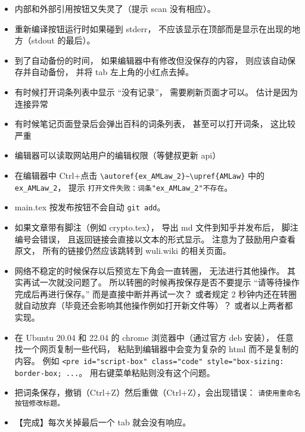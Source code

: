 \begin{itemize}
\item 内部和外部引用按钮又失灵了（提示 scan 没有相应）。

\item 重新编译按钮运行时如果碰到 stderr， 不应该显示在顶部而是显示在出现的地方（stdout 的最后）。

\item 到了自动备份的时间， 如果编辑器中有修改但没保存的内容， 则应该自动保存并自动备份， 并将 tab 左上角的小红点去掉。

\item 有时候打开词条列表中显示 “没有记录”， 需要刷新页面才可以。 估计是因为连接异常

\item 有时候笔记页面登录后会弹出百科的词条列表， 甚至可以打开词条， 这比较严重

\item 编辑器可以读取网站用户的编辑权限（等健叔更新 api）

\item 在编辑器中 Ctrl+点击 \verb|\autoref{ex_AMLaw_2}~\upref{AMLaw}| 中的 \verb|ex_AMLaw_2|， 提示 \verb|打开文件失败：词条"ex_AMLaw_2"不存在|。

\item main.tex 按发布按钮不会自动 \verb|git add|。

\item 如果文章带有脚注（例如 crypto.tex）， 导出 md 文件到知乎并发布后， 脚注编号会错误， 且返回链接会直接以文本的形式显示。 注意为了鼓励用户查看原文， 所有的链接仍然应该跳转到 wuli.wiki 的相关页面。

\item 网络不稳定的时候保存以后预览左下角会一直转圈， 无法进行其他操作。 其实再试一次就没问题了。 所以转圈的时候再按保存是否不要提示 “请等待操作完成后再进行保存。” 而是直接中断并再试一次？ 或者规定 2 秒钟内还在转圈就自动放弃（毕竟还会影响其他操作例如打开新文件等）？ 或者以上两者都实现。

\item 在 Ubuntu 20.04 和 22.04 的 chrome 浏览器中（通过官方 deb 安装）， 任意找一个网页复制一些代码， 粘贴到编辑器中会变为复杂的 html 而不是复制的内容。 例如 \verb|<pre id="script-box" class="code" style="box-sizing: border-box; ...|。 用右键菜单粘贴则没有这个问题。

\item 把词条保存，撤销（Ctrl+Z）然后重做（Ctrl+Z），会出现错误： \verb|请使用重命名按钮修改标题。|

\item 【完成】每次关掉最后一个 tab 就会没有响应。


\end{itemize}
